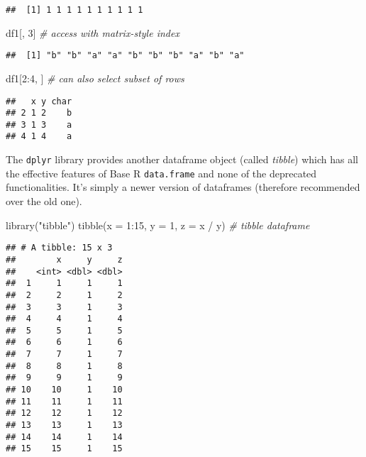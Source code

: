 \documentclass[
  oneside]{book}
\newenvironment{Shaded}{\begin{snugshade}}{\end{snugshade}}
\newcommand{\AttributeTok}[1]{\textcolor[rgb]{0.77,0.63,0.00}{#1}}
\newcommand{\CommentTok}[1]{\textcolor[rgb]{0.56,0.35,0.01}{\textit{#1}}}
\newcommand{\DecValTok}[1]{\textcolor[rgb]{0.00,0.00,0.81}{#1}}
\newcommand{\FunctionTok}[1]{\textcolor[rgb]{0.00,0.00,0.00}{#1}}
\newcommand{\NormalTok}[1]{#1}
\newcommand{\SpecialCharTok}[1]{\textcolor[rgb]{0.00,0.00,0.00}{#1}}
\newcommand{\StringTok}[1]{\textcolor[rgb]{0.31,0.60,0.02}{#1}}
\begin{document}
\begin{verbatim}
##  [1] 1 1 1 1 1 1 1 1 1 1
\end{verbatim}

\begin{Shaded}
\begin{Highlighting}[]
\NormalTok{df1[, }\DecValTok{3}\NormalTok{] }\CommentTok{\# access with matrix{-}style index}
\end{Highlighting}
\end{Shaded}

\begin{verbatim}
##  [1] "b" "b" "a" "a" "b" "b" "b" "a" "b" "a"
\end{verbatim}

\begin{Shaded}
\begin{Highlighting}[]
\NormalTok{df1[}\DecValTok{2}\SpecialCharTok{:}\DecValTok{4}\NormalTok{, ] }\CommentTok{\# can also select subset of rows}
\end{Highlighting}
\end{Shaded}

\begin{verbatim}
##   x y char
## 2 1 2    b
## 3 1 3    a
## 4 1 4    a
\end{verbatim}

The \texttt{dplyr} library provides another dataframe object (called \emph{tibble}) which has all
the effective features of Base R \texttt{data.frame} and none of the
deprecated functionalities. It's simply a newer version of dataframes (therefore
recommended over the old one).

\begin{Shaded}
\begin{Highlighting}[]
\FunctionTok{library}\NormalTok{(}\StringTok{"tibble"}\NormalTok{)}
\FunctionTok{tibble}\NormalTok{(}\AttributeTok{x =} \DecValTok{1}\SpecialCharTok{:}\DecValTok{15}\NormalTok{, }\AttributeTok{y =} \DecValTok{1}\NormalTok{, }\AttributeTok{z =}\NormalTok{ x }\SpecialCharTok{/}\NormalTok{ y) }\CommentTok{\# tibble dataframe}
\end{Highlighting}
\end{Shaded}

\begin{verbatim}
## # A tibble: 15 x 3
##        x     y     z
##    <int> <dbl> <dbl>
##  1     1     1     1
##  2     2     1     2
##  3     3     1     3
##  4     4     1     4
##  5     5     1     5
##  6     6     1     6
##  7     7     1     7
##  8     8     1     8
##  9     9     1     9
## 10    10     1    10
## 11    11     1    11
## 12    12     1    12
## 13    13     1    13
## 14    14     1    14
## 15    15     1    15
\end{verbatim}
\end{document}
